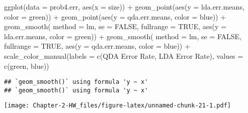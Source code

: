 \documentclass[
]{article}
\newenvironment{Shaded}{\begin{snugshade}}{\end{snugshade}}
\newcommand{\AttributeTok}[1]{\textcolor[rgb]{0.77,0.63,0.00}{#1}}
\newcommand{\ConstantTok}[1]{\textcolor[rgb]{0.00,0.00,0.00}{#1}}
\newcommand{\FunctionTok}[1]{\textcolor[rgb]{0.00,0.00,0.00}{#1}}
\newcommand{\NormalTok}[1]{#1}
\newcommand{\SpecialCharTok}[1]{\textcolor[rgb]{0.00,0.00,0.00}{#1}}
\newcommand{\StringTok}[1]{\textcolor[rgb]{0.31,0.60,0.02}{#1}}
\begin{document}
\begin{Shaded}
\begin{Highlighting}[]
\FunctionTok{ggplot}\NormalTok{(}\AttributeTok{data =}\NormalTok{ prob4.err, }\FunctionTok{aes}\NormalTok{(}\AttributeTok{x =}\NormalTok{ size)) }\SpecialCharTok{+} 
  \FunctionTok{geom\_point}\NormalTok{(}\FunctionTok{aes}\NormalTok{(}\AttributeTok{y =}\NormalTok{ lda.err.means, }\AttributeTok{color =} \StringTok{\textquotesingle{}green\textquotesingle{}}\NormalTok{)) }\SpecialCharTok{+} 
  \FunctionTok{geom\_point}\NormalTok{(}\FunctionTok{aes}\NormalTok{(}\AttributeTok{y =}\NormalTok{ qda.err.means, }\AttributeTok{color =} \StringTok{\textquotesingle{}blue\textquotesingle{}}\NormalTok{)) }\SpecialCharTok{+} 
  \FunctionTok{geom\_smooth}\NormalTok{(}
    \AttributeTok{method =}\NormalTok{ lm,}
    \AttributeTok{se =} \ConstantTok{FALSE}\NormalTok{,}
    \AttributeTok{fullrange =} \ConstantTok{TRUE}\NormalTok{,}
    \FunctionTok{aes}\NormalTok{(}\AttributeTok{y =}\NormalTok{ lda.err.means, }\AttributeTok{color =} \StringTok{\textquotesingle{}green\textquotesingle{}}\NormalTok{)) }\SpecialCharTok{+}
  \FunctionTok{geom\_smooth}\NormalTok{(}
    \AttributeTok{method =}\NormalTok{ lm,}
    \AttributeTok{se =} \ConstantTok{FALSE}\NormalTok{,}
    \AttributeTok{fullrange =} \ConstantTok{TRUE}\NormalTok{,}
    \FunctionTok{aes}\NormalTok{(}\AttributeTok{y =}\NormalTok{ qda.err.means, }\AttributeTok{color =} \StringTok{\textquotesingle{}blue\textquotesingle{}}\NormalTok{)) }\SpecialCharTok{+}
  \FunctionTok{scale\_color\_manual}\NormalTok{(}\AttributeTok{labels =} \FunctionTok{c}\NormalTok{(}\StringTok{\textquotesingle{}QDA Error Rate\textquotesingle{}}\NormalTok{, }\StringTok{\textquotesingle{}LDA Error Rate\textquotesingle{}}\NormalTok{), }\AttributeTok{values =} \FunctionTok{c}\NormalTok{(}\StringTok{\textquotesingle{}green\textquotesingle{}}\NormalTok{, }\StringTok{\textquotesingle{}blue\textquotesingle{}}\NormalTok{))}
\end{Highlighting}
\end{Shaded}

\begin{verbatim}
## `geom_smooth()` using formula 'y ~ x'
## `geom_smooth()` using formula 'y ~ x'
\end{verbatim}

\texttt{[image: Chapter-2-HW\_files/figure-latex/unnamed-chunk-21-1.pdf]}
\end{document}
